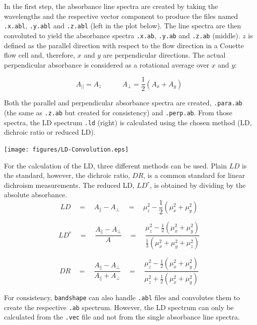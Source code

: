 \documentclass[11pt, letterpaper]{article}
\begin{document}
In the first step, the absorbance line spectra are created by taking the wavelengths and the respective vector component to produce the files named \verb'.x.abl', \verb'.y.abl' and \verb'.z.abl' (left in the plot below). The line spectra are then convoluted to yield the absorbance spectra \verb'.x.ab', \verb'.y.ab' and \verb'.z.ab' (middle). $z$ is defined as the parallel direction with respect to the flow direction in a Couette flow cell and, therefore, $x$ and $y$ are perpendicular directions. The actual perpendicular absorbance is considered as a rotational average over $x$ and $y$:

\begin{equation*}
A_{||} = A_z \quad \quad \quad A_\perp = \frac{1}{2}( A_x + A_y )
\end{equation*}

Both the parallel and perpendicular absorbance spectra are created, \verb'.para.ab' (the same as \verb'.z.ab' but created for consistency) and \verb'.perp.ab'. From those spectra, the LD spectrum \verb'.ld' (right) is calculated using the chosen method (LD, dichroic ratio or reduced LD). 

\texttt{[image: figures/LD-Convolution.eps]}

For the calculation of the LD, three different methods can be used. Plain $LD$ is the standard, however, the dichroic ratio, $DR$, is a common standard for linear dichroism measurements. The reduced LD, $LD^r$, is obtained by dividing by the absolute absorbance.
%
\begin{equation*}
  LD  \quad = \quad A_{\parallel} - A_{\perp}
      \quad = \quad \mu_z^2 - \frac{1}{2} (\mu_x^2 + \mu_y^2)
\end{equation*}

\begin{equation*}
   LD^r \quad = \quad \frac{A_{\parallel} - A_{\perp}}{A} 
        \quad = \quad \frac{\mu_z^2 - \frac{1}{2} (\mu_x^2 + \mu_y^2)}
                {\frac{1}{3} ( \mu_x^2 + \mu_y^2 + \mu_z^2 ) }
\end{equation*}

\begin{equation*}
   DR   \quad = \quad \frac{A_{\parallel} - A_{\perp}}{A_{\parallel} + A_{\perp}}
        \quad = \quad \frac{\mu_z^2 - \frac{1}{2} (\mu_x^2 + \mu_y^2)}
                 {\mu_z^2 + \frac{1}{2} (\mu_x^2 + \mu_y^2)}
\end{equation*}

For consistency, \verb'bandshape' can also handle \verb'.abl' files and convolutes them to create the respective \verb'.ab' spectrum. However, the LD spectrum can only be calculated from the \verb'.vec' file and not from the single absorbance line spectra.
\end{document}
